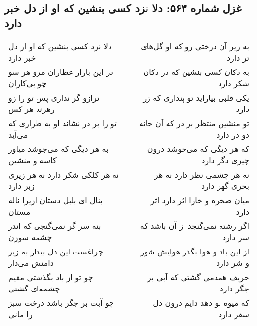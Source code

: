 \begin{center}
\section*{غزل شماره ۵۶۳: دلا نزد کسی بنشین که او از دل خبر دارد}
\label{sec:0563}
\begin{longtable}{l p{0.5cm} r}
دلا نزد کسی بنشین که او از دل خبر دارد
&&
به زیر آن درختی رو که او گل‌های تر دارد
\\
در این بازار عطاران مرو هر سو چو بی‌کاران
&&
به دکان کسی بنشین که در دکان شکر دارد
\\
ترازو گر نداری پس تو را زو رهزند هر کس
&&
یکی قلبی بیاراید تو پنداری که زر دارد
\\
تو را بر در نشاند او به طراری که می‌آید
&&
تو منشین منتظر بر در که آن خانه دو در دارد
\\
به هر دیگی که می‌جوشد میاور کاسه و منشین
&&
که هر دیگی که می‌جوشد درون چیزی دگر دارد
\\
نه هر کلکی شکر دارد نه هر زیری زبر دارد
&&
نه هر چشمی نظر دارد نه هر بحری گهر دارد
\\
بنال ای بلبل دستان ازیرا ناله مستان
&&
میان صخره و خارا اثر دارد اثر دارد
\\
بنه سر گر نمی‌گنجی که اندر چشمه سوزن
&&
اگر رشته نمی‌گنجد از آن باشد که سر دارد
\\
چراغست این دل بیدار به زیر دامنش می‌دار
&&
از این باد و هوا بگذر هوایش شور و شر دارد
\\
چو تو از باد بگذشتی مقیم چشمه‌ای گشتی
&&
حریف همدمی گشتی که آبی بر جگر دارد
\\
چو آبت بر جگر باشد درخت سبز را مانی
&&
که میوه نو دهد دایم درون دل سفر دارد
\\
\end{longtable}
\end{center}

